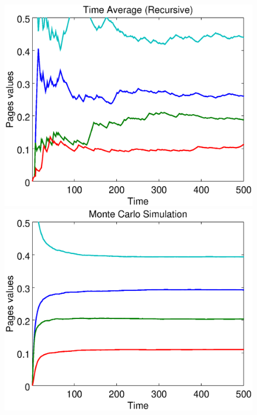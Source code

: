 \documentclass{beamer}
\begin{document}
\begin{frame}
\begin{figure}[!htb]
	\includegraphics[scale=0.2]{figures/500/timerecursive.eps}
	\hspace{0.1cm}
	\includegraphics[scale=0.2]{figures/500/montecarlo.eps}
	\label{}
\end{figure}	
	
\end{frame}
\end{document}
